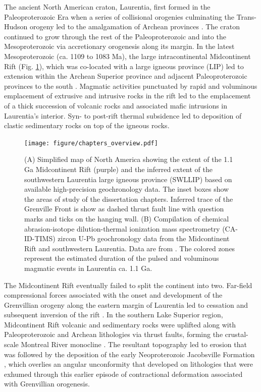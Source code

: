 The ancient North American craton, Laurentia, first formed in the Paleoproterozoic Era when a series of collisional orogenies culminating the Trans-Hudson orogeny led to the amalgamation of Archean provinces \citep{Hoffman1988a, Whitmeyer2007a}. The craton continued to grow through the rest of the Paleoproterozoic and into the Mesoproterozoic via accretionary orogenesis along its margin. In the latest Mesoproterozoic (ca. 1109 to 1083 Ma), the large intracontinental Midcontinent Rift (Fig. \ref{fig:abstract_overview}), which was co-located with a large igneous province (LIP) \citep{Swanson-Hysell2021a} led to extension within the Archean Superior province and adjacent Paleoproterozoic provinces to the south \citep{Cannon1992a}. Magmatic activities punctuated by rapid and voluminous emplacement of extrusive and intrusive rocks in the rift led to the emplacement of a thick succession of volcanic rocks and associated mafic intrusions in Laurentia’s interior. Syn- to post-rift thermal subsidence led to deposition of clastic sedimentary rocks on top of the igneous rocks.

\begin{figure}[h!]
    \centering
    \texttt{[image: figure/chapters\_overview.pdf]}
    \caption[Overview of thesis study area and geochronology data]{(A) Simplified map of North America showing the extent of the 1.1 Ga Midcontinent Rift (purple) and the inferred extent of the southwestern Laurentia large igneous province (SWLLIP) based on available high-precision geochronology data. The inset boxes show the areas of study of the dissertation chapters. Inferred trace of the Grenville Front is show as dashed thrust fault line with question marks and ticks on the hanging wall. (B) Compilation of chemical abrasion-isotope dilution-thermal ionization mass spectrometry (CA-ID-TIMS) zircon U-Pb geochronology data from the Midcontinent Rift and southwestern Laurentia. Data are from \cite{Fairchild2017a, Swanson-Hysell2014a, Swanson-Hysell2019a, Mohr2024a}. The colored zones represent the estimated duration of the pulsed and voluminous magmatic events in Laurentia ca. 1.1 Ga.}
    \label{fig:abstract_overview}
\end{figure}

The Midcontinent Rift eventually failed to split the continent into two. Far-field compressional forces associated with the onset and development of the Grenvillian orogeny along the eastern margin of Laurentia led to cessation and subsequent inversion of the rift \citep{Cannon1993a, Swanson-Hysell2019a}. In the southern Lake Superior region, Midcontinent Rift volcanic and sedimentary rocks were uplifted along with Paleoproterozoic and Archean lithologies via thrust faults, forming the crustal-scale Montreal River monocline \citep{Cannon1993a}. The resultant topography led to erosion that was followed by the deposition of the early Neoproterozoic Jacobsville Formation \citep{Hamblin1958a, Kalliokoski1982a, Hodgin2022a}, which overlies an angular unconformity that developed on lithologies that were exhumed through this earlier episode of contractional deformation associated with Grenvillian orogenesis. 

